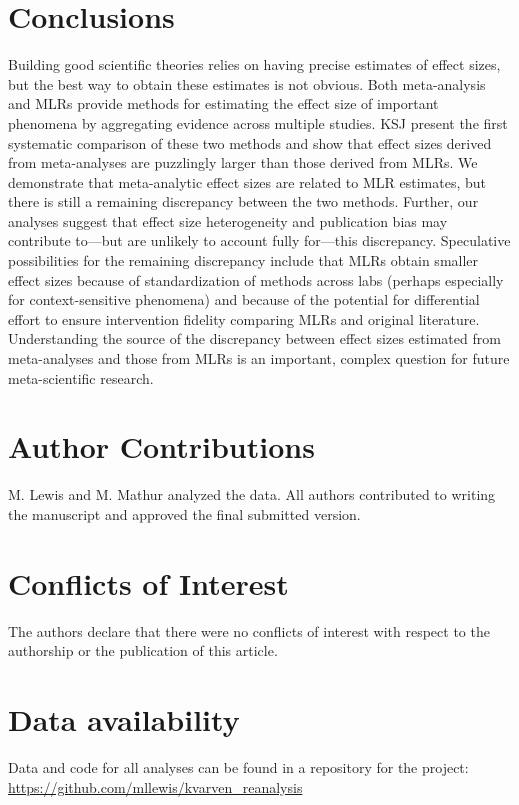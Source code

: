 \documentclass[man,floatsintext]{apa7}
\begin{document}
\section{Conclusions}

Building good scientific theories relies on having precise estimates of effect sizes, but the best way to obtain these estimates is not obvious. Both meta-analysis and MLRs provide methods for estimating the effect size of important phenomena by aggregating evidence across multiple studies. KSJ present the first systematic comparison of these two methods and show that effect sizes derived from meta-analyses are puzzlingly larger than those derived from MLRs. We demonstrate that meta-analytic effect sizes are related to MLR estimates, but there is still a remaining discrepancy between the two methods. Further, our analyses suggest that effect size heterogeneity and publication bias may contribute to---but are unlikely to account fully for---this discrepancy. Speculative possibilities for the remaining discrepancy include that MLRs obtain smaller effect sizes because of standardization of methods across labs (perhaps especially for context-sensitive phenomena) and because of the potential for differential effort to ensure intervention fidelity comparing MLRs and original literature. Understanding the source of the discrepancy between effect sizes estimated from meta-analyses and those from MLRs is an important, complex question for future meta-scientific research. 

\nocite{kvarven2020comparing} 

\section{Author Contributions}
\noindent M. Lewis and M. Mathur analyzed the data. All authors contributed to writing the manuscript and  approved the final submitted version.


\section{Conflicts of Interest}
\noindent The authors declare that there were no conflicts of interest with respect to the authorship or the publication of this article.

\section{Data availability}
\noindent Data and code for all analyses can be found in a repository for the project: \href{https://github.com/mllewis/kvarven_reanalysis/}{https://github.com/mllewis/kvarven\_reanalysis}
\end{document}
